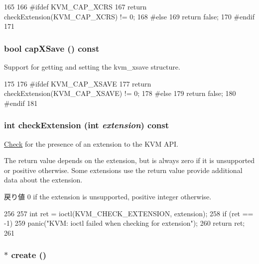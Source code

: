 \begin{DoxyCode}
165 {
166 #ifdef KVM_CAP_XCRS
167     return checkExtension(KVM_CAP_XCRS) != 0;
168 #else
169     return false;
170 #endif
171 }
\end{DoxyCode}
\hypertarget{classKvm_a9c6bbe65d43e3f2708723fc21f00b4cd}{
\subsubsection[{capXSave}]{\setlength{\rightskip}{0pt plus 5cm}bool capXSave () const}}
\label{classKvm_a9c6bbe65d43e3f2708723fc21f00b4cd}
Support for getting and setting the kvm\_\-xsave structure. 


\begin{DoxyCode}
175 {
176 #ifdef KVM_CAP_XSAVE
177     return checkExtension(KVM_CAP_XSAVE) != 0;
178 #else
179     return false;
180 #endif
181 }
\end{DoxyCode}
\hypertarget{classKvm_a8e6e0d0db01a127dd0798b0a87263a29}{
\subsubsection[{checkExtension}]{\setlength{\rightskip}{0pt plus 5cm}int checkExtension (int {\em extension}) const}}
\label{classKvm_a8e6e0d0db01a127dd0798b0a87263a29}
\hyperlink{classCheck}{Check} for the presence of an extension to the KVM API.

The return value depends on the extension, but is always zero if it is unsupported or positive otherwise. Some extensions use the return value provide additional data about the extension.

\begin{DoxyReturn}{戻り値}
0 if the extension is unsupported, positive integer otherwise. 
\end{DoxyReturn}



\begin{DoxyCode}
256 {
257     int ret = ioctl(KVM_CHECK_EXTENSION, extension);
258     if (ret == -1)
259         panic("KVM: ioctl failed when checking for extension\n");
260     return ret;
261 }
\end{DoxyCode}
\hypertarget{classKvm_a5a41f15f5b11ddab46bb5622409aea52}{
\subsubsection[{create}]{ $\ast$ create ()}}
\label{classKvm_a5a41f15f5b11ddab46bb5622409aea52}




